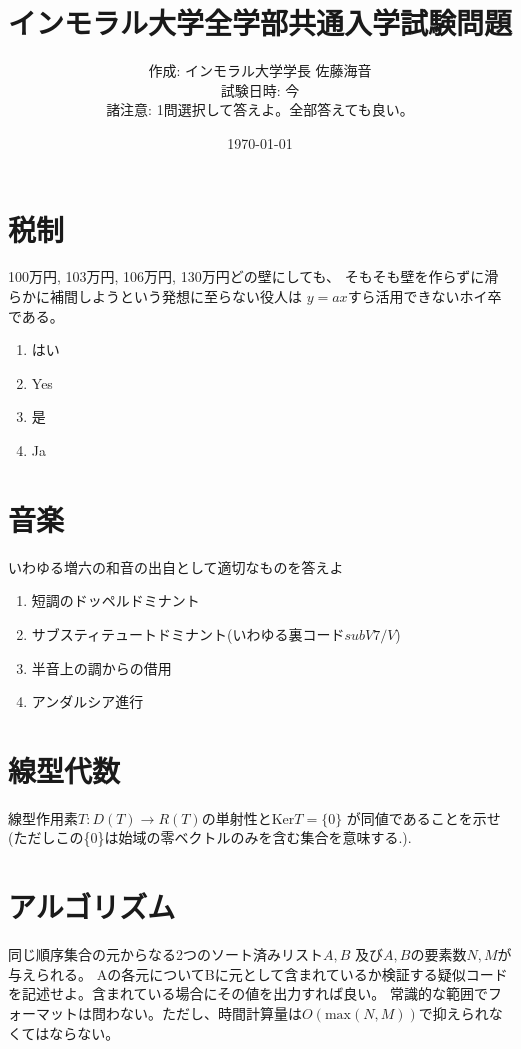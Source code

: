 \documentclass[uplatex]{jsarticle}
\title{インモラル大学全学部共通入学試験問題}
\author{
    作成: インモラル大学学長 佐藤海音 \\
    試験日時: 今 \\
    諸注意: 1問選択して答えよ。全部答えても良い。
}
\date{\today}
\begin{document}
\maketitle
\newpage


\section{税制}
100万円, 103万円, 106万円, 130万円どの壁にしても、
そもそも壁を作らずに滑らかに補間しようという発想に至らない役人は
$y=ax$すら活用できないホイ卒である。
\begin{enumerate}
    \item はい
    \item Yes
    \item 是
    \item Ja
\end{enumerate}

\section{音楽}
いわゆる増六の和音の出自として適切なものを答えよ
\begin{enumerate}
    \item 短調のドッペルドミナント
    \item サブスティテュートドミナント(いわゆる裏コード$subV7/V$)
    \item 半音上の調からの借用
    \item アンダルシア進行
\end{enumerate}

\section{線型代数}
線型作用素$T:D(T)\rightarrow R(T)$の単射性と$\mbox{Ker}T=\{0\}$
が同値であることを示せ(ただしこの\{0\}は始域の零ベクトルのみを含む集合を意味する.).

\section{アルゴリズム}
同じ順序集合の元からなる2つのソート済みリスト$A,B$ 及び$A,B$の要素数$N,M$が与えられる。
Aの各元についてBに元として含まれているか検証する疑似コードを記述せよ。含まれている場合にその値を出力すれば良い。
常識的な範囲でフォーマットは問わない。ただし、時間計算量は$O(\mbox{max}(N,M))$で抑えられなくてはならない。


\newpage
\end{document}
